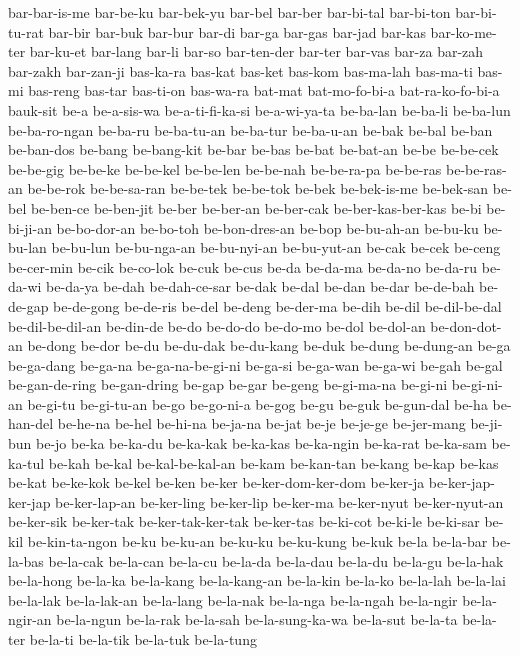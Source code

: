 {bar-bar-is-me bar-be-ku bar-bek-yu bar-bel bar-ber bar-bi-tal bar-bi-ton
bar-bi-tu-rat bar-bir bar-buk bar-bur bar-di bar-ga bar-gas bar-jad
bar-kas bar-ko-me-ter bar-ku-et bar-lang bar-li bar-so bar-ten-der bar-ter
bar-vas bar-za bar-zah bar-zakh bar-zan-ji bas-ka-ra bas-kat bas-ket
bas-kom bas-ma-lah bas-ma-ti bas-mi bas-reng bas-tar bas-ti-on bas-wa-ra
bat-mat bat-mo-fo-bi-a bat-ra-ko-fo-bi-a bauk-sit be-a be-a-sis-wa
be-a-ti-fi-ka-si be-a-wi-ya-ta be-ba-lan be-ba-li be-ba-lun be-ba-ro-ngan
be-ba-ru be-ba-tu-an be-ba-tur be-ba-u-an be-bak be-bal be-ban be-ban-dos
be-bang be-bang-kit be-bar be-bas be-bat be-bat-an be-be be-be-cek
be-be-gig be-be-ke be-be-kel be-be-len be-be-nah be-be-ra-pa be-be-ras
be-be-ras-an be-be-rok be-be-sa-ran be-be-tek be-be-tok be-bek
be-bek-is-me be-bek-san be-bel be-ben-ce be-ben-jit be-ber be-ber-an
be-ber-cak be-ber-kas-ber-kas be-bi be-bi-ji-an be-bo-dor-an be-bo-toh
be-bon-dres-an be-bop be-bu-ah-an be-bu-ku be-bu-lan be-bu-lun
be-bu-nga-an be-bu-nyi-an be-bu-yut-an be-cak be-cek be-ceng be-cer-min
be-cik be-co-lok be-cuk be-cus be-da be-da-ma be-da-no be-da-ru be-da-wi
be-da-ya be-dah be-dah-ce-sar be-dak be-dal be-dan be-dar be-de-bah
be-de-gap be-de-gong be-de-ris be-del be-deng be-der-ma be-dih be-dil
be-dil-be-dal be-dil-be-dil-an be-din-de be-do be-do-do be-do-mo be-dol
be-dol-an be-don-dot-an be-dong be-dor be-du be-du-dak be-du-kang be-duk
be-dung be-dung-an be-ga be-ga-dang be-ga-na be-ga-na-be-gi-ni be-ga-si
be-ga-wan be-ga-wi be-gah be-gal be-gan-de-ring be-gan-dring be-gap be-gar
be-geng be-gi-ma-na be-gi-ni be-gi-ni-an be-gi-tu be-gi-tu-an be-go
be-go-ni-a be-gog be-gu be-guk be-gun-dal be-ha be-han-del be-he-na be-hel
be-hi-na be-ja-na be-jat be-je be-je-ge be-jer-mang be-ji-bun be-jo be-ka
be-ka-du be-ka-kak be-ka-kas be-ka-ngin be-ka-rat be-ka-sam be-ka-tul
be-kah be-kal be-kal-be-kal-an be-kam be-kan-tan be-kang be-kap be-kas
be-kat be-ke-kok be-kel be-ken be-ker be-ker-dom-ker-dom be-ker-ja
be-ker-jap-ker-jap be-ker-lap-an be-ker-ling be-ker-lip be-ker-ma
be-ker-nyut be-ker-nyut-an be-ker-sik be-ker-tak be-ker-tak-ker-tak
be-ker-tas be-ki-cot be-ki-le be-ki-sar be-kil be-kin-ta-ngon be-ku
be-ku-an be-ku-ku be-ku-kung be-kuk be-la be-la-bar be-la-bas be-la-cak
be-la-can be-la-cu be-la-da be-la-dau be-la-du be-la-gu be-la-hak
be-la-hong be-la-ka be-la-kang be-la-kang-an be-la-kin be-la-ko be-la-lah
be-la-lai be-la-lak be-la-lak-an be-la-lang be-la-nak be-la-nga be-la-ngah
be-la-ngir be-la-ngir-an be-la-ngun be-la-rak be-la-sah be-la-sung-ka-wa
be-la-sut be-la-ta be-la-ter be-la-ti be-la-tik be-la-tuk be-la-tung
}
